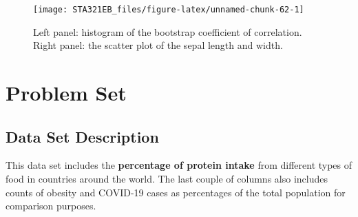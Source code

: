 \documentclass[
]{book}
\newenvironment{Shaded}{\begin{snugshade}}{\end{snugshade}}
\newcommand{\AttributeTok}[1]{\textcolor[rgb]{0.13,0.29,0.53}{#1}}
\newcommand{\CommentTok}[1]{\textcolor[rgb]{0.56,0.35,0.01}{\textit{#1}}}
\newcommand{\DecValTok}[1]{\textcolor[rgb]{0.00,0.00,0.81}{#1}}
\newcommand{\DocumentationTok}[1]{\textcolor[rgb]{0.56,0.35,0.01}{\textbf{\textit{#1}}}}
\newcommand{\FunctionTok}[1]{\textcolor[rgb]{0.13,0.29,0.53}{\textbf{#1}}}
\newcommand{\NormalTok}[1]{#1}
\newcommand{\SpecialCharTok}[1]{\textcolor[rgb]{0.81,0.36,0.00}{\textbf{#1}}}
\newcommand{\StringTok}[1]{\textcolor[rgb]{0.31,0.60,0.02}{#1}}
\begin{document}
\begin{Shaded}
\end{Shaded}

\begin{figure}

{\centering \texttt{[image: STA321EB\_files/figure-latex/unnamed-chunk-62-1]} 

}

\caption{Left panel: histogram of the bootstrap coefficient of correlation. Right panel: the scatter plot of the sepal length and width.}\label{fig:unnamed-chunk-62}
\end{figure}

\hypertarget{problem-set}{%
\section{Problem Set}\label{problem-set}}

\hypertarget{data-set-description-1}{%
\subsection{Data Set Description}\label{data-set-description-1}}

This data set includes the \textbf{percentage of protein intake} from different types of food in countries around the world. The last couple of columns also includes counts of obesity and COVID-19 cases as percentages of the total population for comparison purposes.
\end{document}
